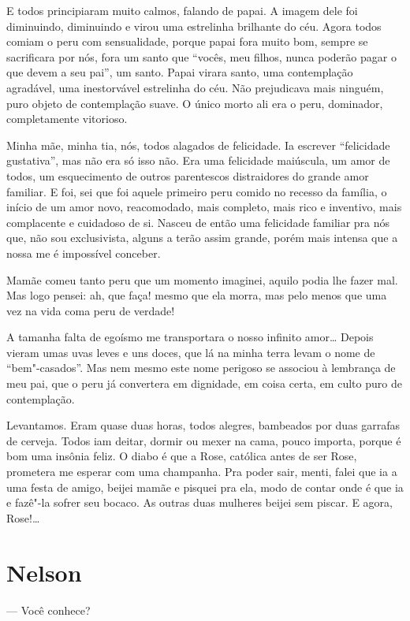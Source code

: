 E todos principiaram muito calmos, falando de papai. A imagem dele foi
diminuindo, diminuindo e virou uma estrelinha brilhante do céu. Agora
todos comiam o peru com sensualidade, porque papai fora muito bom,
sempre se sacrificara por nós, fora um santo que ``vocês, meu filhos,
nunca poderão pagar o que devem a seu pai'', um santo. Papai virara
santo, uma contemplação agradável, uma inestorvável estrelinha do céu.
Não prejudicava mais ninguém, puro objeto de contemplação suave. O único
morto ali era o peru, dominador, completamente vitorioso.

Minha mãe, minha tia, nós, todos alagados de felicidade. Ia escrever
``felicidade gustativa'', mas não era só isso não. Era uma felicidade
maiúscula, um amor de todos, um esquecimento de outros parentescos
distraidores do grande amor familiar. E foi, sei que foi aquele primeiro
peru comido no recesso da família, o início de um amor novo,
reacomodado, mais completo, mais rico e inventivo, mais complacente e
cuidadoso de si. Nasceu de então uma felicidade familiar pra nós que,
não sou exclusivista, alguns a terão assim grande, porém mais intensa
que a nossa me é impossível conceber.

Mamãe comeu tanto peru que um momento imaginei, aquilo podia lhe fazer
mal. Mas logo pensei: ah, que faça! mesmo que ela morra, mas pelo menos
que uma vez na vida coma peru de verdade!

A tamanha falta de egoísmo me transportara o nosso infinito amor\ldots{}
Depois vieram umas uvas leves e uns doces, que lá na minha terra levam o
nome de ``bem"-casados''. Mas nem mesmo este nome perigoso se associou à
lembrança de meu pai, que o peru já convertera em dignidade, em coisa
certa, em culto puro de contemplação.

Levantamos. Eram quase duas horas, todos alegres, bambeados por duas
garrafas de cerveja. Todos iam deitar, dormir ou mexer na cama, pouco
importa, porque é bom uma insônia feliz. O diabo é que a Rose, católica
antes de ser Rose, prometera me esperar com uma champanha. Pra poder
sair, menti, falei que ia a uma festa de amigo, beijei mamãe e pisquei
pra ela, modo de contar onde é que ia e fazê"-la sofrer seu bocaco. As
outras duas mulheres beijei sem piscar. E agora, Rose!\ldots{}

\chapter{Nelson}

--- Você conhece?


